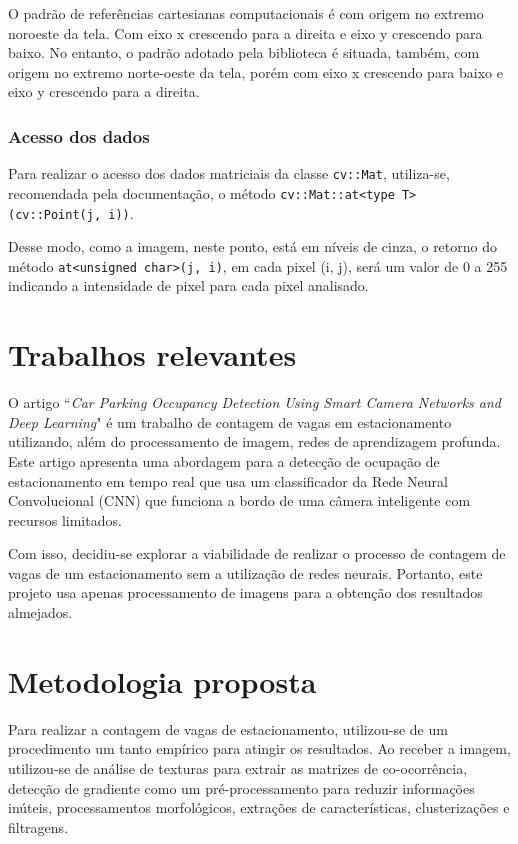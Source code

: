 \documentclass[10pt,twocolumn,letterpaper]{article}
\begin{document}
	O padrão de referências cartesianas computacionais é com origem no extremo noroeste
da tela. Com eixo x crescendo para a direita e eixo y crescendo para baixo. No entanto,
o padrão adotado pela biblioteca é situada, também, com origem no extremo norte-oeste da tela,
porém com eixo x crescendo para baixo e eixo y crescendo para a direita.


\subsubsection{Acesso dos dados}

	Para realizar o acesso dos dados matriciais da classe \verb'cv::Mat', utiliza-se,
recomendada pela documentação\cite{devdocs}, o método
\verb'cv::Mat::at<type T> (cv::Point(j, i))'. 

	Desse modo, como a imagem, neste ponto, está em níveis de cinza, o retorno
do método \verb'at<unsigned char>(j, i)', em cada pixel (i, j), será um valor de
0 a 255 indicando a intensidade de pixel para cada pixel analisado.




\section{Trabalhos relevantes}

	O artigo ``{\em Car Parking Occupancy Detection Using Smart Camera Networks
and Deep Learning}" é um trabalho de contagem de vagas em estacionamento utilizando,
além do processamento de imagem, redes de aprendizagem profunda. Este artigo
apresenta uma abordagem para a detecção de ocupação de estacionamento
em tempo real que usa um classificador da Rede Neural Convolucional
(CNN) que funciona a bordo de uma câmera inteligente com recursos limitados.

	Com isso, decidiu-se explorar a viabilidade de realizar o processo de contagem de
vagas de um estacionamento sem a utilização de redes neurais. Portanto, este projeto
usa apenas processamento de imagens para a obtenção dos resultados almejados.




\section{Metodologia proposta}

	Para realizar a contagem de vagas de estacionamento, utilizou-se de um procedimento
um tanto empírico para atingir os resultados. Ao receber a imagem, utilizou-se de análise
de texturas para extrair as matrizes de co-ocorrência, detecção de gradiente como um
pré-processamento para reduzir informações inúteis, processamentos morfológicos,
extrações de características, clusterizações e filtragens.
\end{document}
